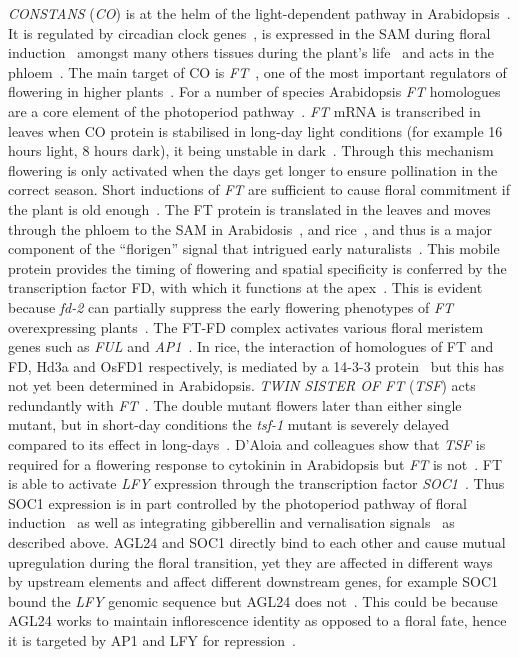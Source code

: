 \emph{CONSTANS} (\emph{CO}) is at the helm of the light-dependent pathway in Arabidopsis~\cite{suarezlopez2001}.
It is regulated by circadian clock genes~\cite{suarezlopez2001}, is expressed in the SAM during floral induction~\cite{simon1996} amongst many others tissues during the plant's life~\cite{an2004} and acts in the phloem~\cite{an2004}.
The main target of CO is \emph{FT}~\cite{samach2000,kardailsky1999,kobayashi1999}, one of the most important regulators of flowering in higher plants~\cite{turck2008}.
For a number of species Arabidopsis \emph{FT} homologues are a core element of the photoperiod pathway~\cite{higgins2010,tamaki2007}.
\emph{FT} mRNA is transcribed in leaves when CO protein is stabilised in long-day light conditions (for example 16 hours light, 8 hours dark), it being unstable in dark~\cite{valverde2004}.
Through this mechanism flowering is only activated when the days get longer to ensure pollination in the correct season.
Short inductions of \emph{FT} are sufficient to cause floral commitment if the plant is old enough~\cite{corbesier1996}.
The FT protein is translated in the leaves and moves through the phloem to the SAM in Arabidosis~\cite{corbesier2007,mathieu2007,jaeger2007}, and rice~\cite{tamaki2007}, and thus is a major component of the ``florigen'' signal that intrigued early naturalists~\cite{turck2008}.
This mobile protein provides the timing of flowering and spatial specificity is conferred by the transcription factor FD, with which it functions at the apex~\cite{wigge2005,abe2005}.
This is evident because \emph{fd-2} can partially suppress the early flowering phenotypes of \emph{FT} overexpressing plants~\cite{wigge2005,abe2005}.
The FT-FD complex activates various floral meristem genes such as \emph{FUL} and \emph{AP1}~\cite{teper2005,wigge2005,abe2005}.
In rice, the interaction of homologues of FT and FD, Hd3a and OsFD1 respectively, is mediated by a 14-3-3 protein~\cite{taoka2011} but this has not yet been determined in Arabidopsis.
\emph{TWIN SISTER OF FT} (\emph{TSF}) acts redundantly with \emph{FT}~\cite{yamaguchi2005}.
The double mutant flowers later than either single mutant, but in short-day conditions the \emph{tsf-1} mutant is severely delayed compared to its effect in long-days~\cite{yamaguchi2005}.
D'Aloia and colleagues show that \emph{TSF} is required for a flowering response to cytokinin in Arabidopsis but \emph{FT} is not~\cite{daloia2011}.
FT is able to activate \emph{LFY} expression through the transcription factor \emph{SOC1}~\cite{yoo2005,lee2008}.
Thus SOC1 expression is in part controlled by the photoperiod pathway of floral induction~\cite{borner2000} as well as integrating gibberellin and vernalisation signals~\cite{moon2003} as described above.
AGL24 and SOC1 directly bind to each other and cause mutual upregulation during the floral transition, yet they are affected in different ways by upstream elements and affect different downstream genes, for example SOC1 bound the \emph{LFY} genomic sequence but AGL24 does not~\cite{liu2008}.
This could be because AGL24 works to maintain inflorescence identity as opposed to a floral fate, hence it is targeted by AP1 and LFY for repression~\cite{yu2004}.

